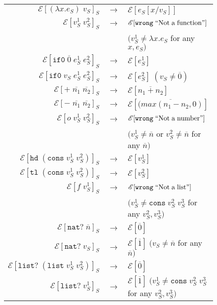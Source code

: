 \begin{figure}
\onehalfspacing
\begin{center}
\begin{tabular}{rcl}
$\mathscr{E}[(\lambda x.e_{S})\;v_{S}]_{S}$ & $\rightarrow$ & $\mathscr{E}[e_{S}[x/v_{S}]]$ \\
$\mathscr{E}[v_{S}^{1}\;v_{S}^{2}]_{S}$ & $\rightarrow$ & $\mathscr{E}[\mathtt{wrong}\;\mathrm{``Not\;a\;function"}]$ \\
&& $(v_{S}^{1}\neq\lambda x.e_{S}$ for any $x,e_{S})$ \\
$\mathscr{E}[\mathtt{if0}\;\overline{0}\;e_{S}^{1}\;e_{S}^{2}]_{S}$ & $\rightarrow$ & $\mathscr{E}[e_{S}^{1}]$ \\
$\mathscr{E}[\mathtt{if0}\;v_{S}\;e_{S}^{1}\;e_{S}^{2}]_{S}$ & $\rightarrow$ & $\mathscr{E}[e_{S}^{2}]\;(v_{S}\neq\overline{0})$ \\
$\mathscr{E}[+\;\overline{n_{1}}\;\overline{n_{2}}]_{S}$ & $\rightarrow$ & $\mathscr{E}[\overline{n_{1}+n_{2}}]$ \\
$\mathscr{E}[-\;\overline{n_{1}}\;\overline{n_{2}}]_{S}$ & $\rightarrow$ & $\mathscr{E}[\overline{(max(n_{1}-n_{2},0)}]$ \\
$\mathscr{E}[o\;v_{S}^{1}\;v_{S}^{2}]_{S}$ & $\rightarrow$ & $\mathscr{E}[\mathtt{wrong}\;\mathrm{``Not\;a\;number"}]$ \\
&& $(v_{S}^{1}\neq\overline{n}$ or $v_{S}^{2}\neq\overline{n}$ for any $\overline{n})$ \\
$\mathscr{E}[\mathtt{hd}\;(\mathtt{cons}\;v_{S}^{1}\;v_{S}^{2})]_{S}$ & $\rightarrow$ & $\mathscr{E}[v_{S}^{1}]$ \\
$\mathscr{E}[\mathtt{tl}\;(\mathtt{cons}\;v_{S}^{1}\;v_{S}^{2})]_{S}$ & $\rightarrow$ & $\mathscr{E}[v_{S}^{2}]$ \\
$\mathscr{E}[f\;v_{S}^{1}]_{S}$ & $\rightarrow$ & $\mathscr{E}[\mathtt{wrong}\;\mathrm{``Not\;a\;list"}]$ \\
&& $(v_{S}^{1}\neq\mathtt{cons}\;v_{S}^{2}\;v_{S}^{3}$ for any $v_{S}^{2},v_{S}^{3})$ \\
$\mathscr{E}[\mathtt{nat?}\;\overline{n}]_{S}$ & $\rightarrow$ & $\mathscr{E}[\overline{0}]$ \\
$\mathscr{E}[\mathtt{nat?}\;v_{S}]_{S}$ & $\rightarrow$ & $\mathscr{E}[\overline{1}]\;(v_{S}\neq\overline{n}$ for any $\overline{n})$ \\
$\mathscr{E}[\mathtt{list?}\;(\mathtt{list}\;v_{S}^{1}\;v_{S}^{2})]_{S}$ & $\rightarrow$ & $\mathscr{E}[\overline{0}]$ \\
$\mathscr{E}[\mathtt{list?}\;v_{S}^{1}]_{S}$ & $\rightarrow$ & $\mathscr{E}[\overline{1}]\;(v_{S}^{1}\neq\mathtt{cons}\;v_{S}^{2}\;v_{S}^{3}$ for any $v_{S}^{2},v_{S}^{3})$ \\

\end{tabular}
\end{center}
\end{figure}
